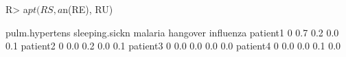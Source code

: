 \begin{Schunk}
% --begin: "comp.circ.excl.unavoid"
\begin{Sinput}
R> a$pt(RS, a$n(RE), RU)
\end{Sinput}
\begin{Soutput}
         pulm.hypertens sleeping.sickn malaria hangover influenza
patient1              0            0.7     0.2      0.0       0.1
patient2              0            0.0     0.2      0.0       0.1
patient3              0            0.0     0.0      0.0       0.0
patient4              0            0.0     0.0      0.1       0.0
\end{Soutput}
%
% --end: "comp.circ.excl.unavoid"
\end{Schunk}

